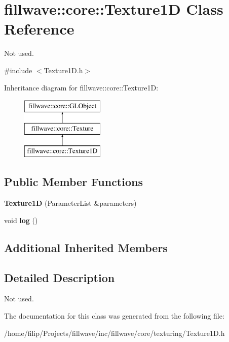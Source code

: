 \hypertarget{classfillwave_1_1core_1_1Texture1D}{}\section{fillwave\+:\+:core\+:\+:Texture1\+D Class Reference}
\label{classfillwave_1_1core_1_1Texture1D}


Not used.  




{\ttfamily \#include $<$Texture1\+D.\+h$>$}

Inheritance diagram for fillwave\+:\+:core\+:\+:Texture1\+D\+:\begin{figure}[H]
\begin{center}
\leavevmode
\includegraphics[height=3.000000cm]{classfillwave_1_1core_1_1Texture1D}
\end{center}
\end{figure}
\subsection*{Public Member Functions}
\begin{DoxyCompactItemize}
\item 
\hypertarget{classfillwave_1_1core_1_1Texture1D_a7262b6db438e7a535474a1e31a92e099}{}{\bfseries Texture1\+D} (Parameter\+List \&parameters)\label{classfillwave_1_1core_1_1Texture1D_a7262b6db438e7a535474a1e31a92e099}

\item 
\hypertarget{classfillwave_1_1core_1_1Texture1D_a38590dba5db5e9e34fef9616ef4ae8dc}{}void {\bfseries log} ()\label{classfillwave_1_1core_1_1Texture1D_a38590dba5db5e9e34fef9616ef4ae8dc}

\end{DoxyCompactItemize}
\subsection*{Additional Inherited Members}


\subsection{Detailed Description}
Not used. 

The documentation for this class was generated from the following file\+:\begin{DoxyCompactItemize}
\item 
/home/filip/\+Projects/fillwave/inc/fillwave/core/texturing/Texture1\+D.\+h\end{DoxyCompactItemize}
